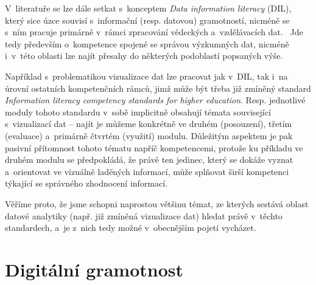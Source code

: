 V~literatuře se lze dále setkat s~konceptem \emph{Data information literacy} (DIL), který sice úzce souvisí s~informační (resp. datovou) gramotností, nicméně se s~ním pracuje primárně v~rámci zpracování vědeckých a~vzdělávacích dat.~\parencite{jeffryes13} Jde tedy především o~kompetence spojené se správou výzkumných dat, nicméně i~v~této oblasti lze najít přesahy do některých podoblastí popsaných výše.

Například s~problematikou vizualizace dat lze pracovat jak v~DIL, tak i~na úrovní ostatních kompetenčních rámců, jimž může být třeba již zmíněný standard \emph{Information literacy competency standards for higher education}. Resp. jednotlivé moduly tohoto standardu v~sobě implicitně obsahují témata související s~vizualizací dat -- najít je můžeme konkrétně ve druhém (posouzení), třetím (evaluace) a~primárně čtvrtém (využití) modulu. Důležitým aspektem je pak pasivní přítomnost tohoto tématu napříč kompetencemi, protože ku příkladu ve druhém modulu se předpokládá, že právě ten jedinec, který se dokáže vyznat a~orientovat ve vizuálně laděných informací, může splňovat širší kompetenci týkající se správného zhodnocení informací.~\parencite{womack14}

Věříme proto, že jsme schopni naprostou většinu témat, ze kterých sestává oblast datové analytiky (např. již zmíněná vizualizace dat) hledat právě v~těchto standardech, a~je z~nich tedy možné v~obecnějším pojetí vycházet.

\hypertarget{digituxe1lnuxed-gramotnost}{%
\section{Digitální gramotnost}\label{digituxe1lnuxed-gramotnost}}
